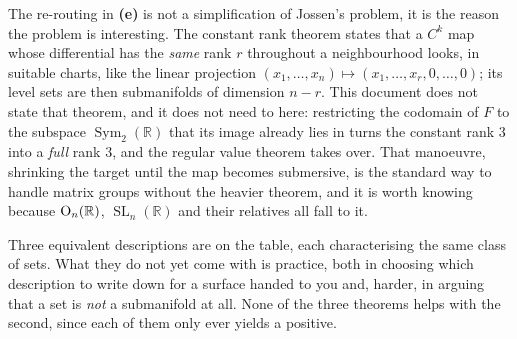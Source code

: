 \begin{ainote}
The re-routing in \textbf{(e)} is not a simplification of Jossen's problem, it is the reason the
problem is interesting. The constant rank theorem states that a $C^k$ map whose differential has
the \emph{same} rank $r$ throughout a neighbourhood looks, in suitable charts, like the linear
projection $(x_1,\dots,x_n) \mapsto (x_1,\dots,x_r,0,\dots,0)$; its level sets are then
submanifolds of dimension $n-r$. This document does not state that theorem, and it does not need
to here: restricting the codomain of $F$ to the subspace $\operatorname{Sym}_2(\mathbb{R})$ that
its image already lies in turns the constant rank $3$ into a \emph{full} rank $3$, and the regular
value theorem takes over. That manoeuvre, shrinking the target until the map becomes submersive,
is the standard way to handle matrix groups without the heavier theorem, and it is worth
knowing because $\operatorname{O}_n(\mathbb{R})$, $\operatorname{SL}_n(\mathbb{R})$ and their relatives all
fall to it.
\end{ainote}

Three equivalent descriptions are on the table, each characterising the same class of sets. What
they do not yet come with is practice, both in choosing which description to write down for a
surface handed to you and, harder, in arguing that a set is \emph{not} a submanifold at all.
None of the three theorems helps with the second, since each of them only ever yields a positive.
